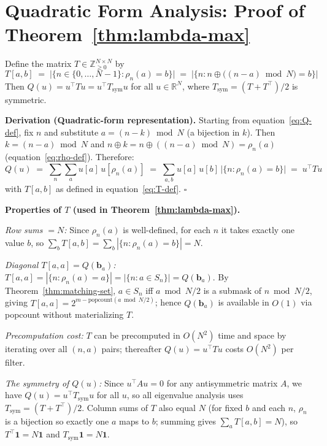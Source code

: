 \documentclass[11pt]{article}
\begin{document}
\section{Quadratic Form Analysis: Proof of Theorem~\ref{thm:lambda-max}}
\label{app:quadratic-form}

Define the matrix $T \in \mathbb{Z}_{\geq 0}^{N \times N}$ by
\begin{equation}\label{eq:T-def}
    T[a,b] \;=\; \bigl|\bigl\{n \in \{0,\ldots,N-1\} : \rho_n(a) = b\bigr\}\bigr|
    \;=\; \bigl|\bigl\{n : n \oplus \bigl((n-a)\bmod N\bigr) = b\bigr\}\bigr|
\end{equation}
Then $Q(u) = u^\top T u = u^\top T_{\mathrm{sym}} u$ for all $u \in \mathbb{R}^N$, where $T_{\mathrm{sym}} = (T + T^\top)/2$ is symmetric.

\medskip
\noindent\textbf{Derivation (Quadratic-form representation).}
Starting from equation~\eqref{eq:Q-def}, fix $n$ and substitute $a = (n-k)\bmod N$ (a bijection in $k$). Then $k = (n-a)\bmod N$ and $n\oplus k = n\oplus((n-a)\bmod N) = \rho_n(a)$ (equation~\eqref{eq:rho-def}). Therefore:
\[
    Q(u) \;=\; \sum_n \sum_a u[a]\,u[\rho_n(a)]
    \;=\; \sum_{a,b} u[a]\,u[b]\,\bigl|\{n : \rho_n(a) = b\}\bigr|
    \;=\; u^\top T u
\]
with $T[a,b]$ as defined in equation~\eqref{eq:T-def}. $\square$

\medskip
\noindent\textbf{Properties of $T$ (used in Theorem~\ref{thm:lambda-max}).}

\textit{Row sums $= N$:} Since $\rho_n(a)$ is well-defined, for each $n$ it takes exactly one value $b$, so $\sum_b T[a,b] = \sum_b |\{n : \rho_n(a) = b\}| = N$.

\textit{Diagonal $T[a,a] = Q(\mathbf{b}_a)$:} $T[a,a] = |\{n : \rho_n(a) = a\}| = |\{n : a \in S_n\}| = Q(\mathbf{b}_a)$. By Theorem~\ref{thm:matching-set}, $a \in S_n$ iff $a \bmod N/2$ is a submask of $n \bmod N/2$, giving $T[a,a] = 2^{m-\mathrm{popcount}(a\bmod N/2)}$; hence $Q(\mathbf{b}_a)$ is available in $O(1)$ via popcount without materializing $T$.

\textit{Precomputation cost:} $T$ can be precomputed in $O(N^2)$ time and space by iterating over all $(n,a)$ pairs; thereafter $Q(u) = u^\top Tu$ costs $O(N^2)$ per filter.

\textit{The symmetry of $Q(u)$:} Since $u^\top A u = 0$ for any antisymmetric matrix $A$, we have $Q(u) = u^\top T_{\mathrm{sym}} u$ for all $u$, so all eigenvalue analysis uses $T_{\mathrm{sym}} = (T+T^\top)/2$. Column sums of $T$ also equal $N$ (for fixed $b$ and each $n$, $\rho_n$ is a bijection so exactly one $a$ maps to $b$; summing gives $\sum_a T[a,b] = N$), so $T^\top \mathbf{1} = N\mathbf{1}$ and $T_{\mathrm{sym}}\mathbf{1} = N\mathbf{1}$.
\end{document}
